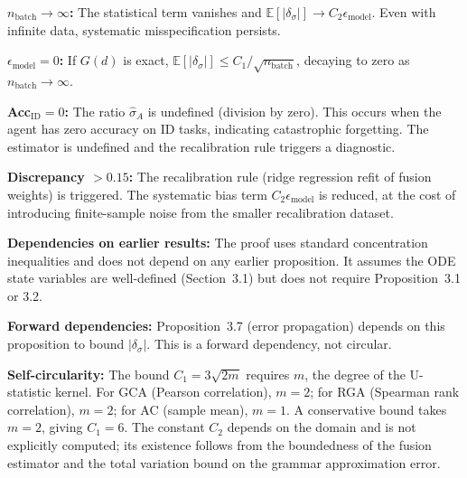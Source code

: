 \begin{boundary-case}
\textbf{$n_{\text{batch}} \to \infty$:}
The statistical term vanishes and $\mathbb{E}[|\delta_\sigma|] \to C_2 \epsilon_{\text{model}}$.
Even with infinite data, systematic misspecification persists.

\textbf{$\epsilon_{\text{model}} = 0$:}
If $G(d)$ is exact, $\mathbb{E}[|\delta_\sigma|] \leq C_1 / \sqrt{n_{\text{batch}}}$,
decaying to zero as $n_{\text{batch}} \to \infty$.

\textbf{Acc${}_{\text{ID}} = 0$:}
The ratio $\hat{\sigma}_A$ is undefined (division by zero). This occurs
when the agent has zero accuracy on ID tasks, indicating catastrophic
forgetting. The estimator is undefined and the recalibration rule
triggers a diagnostic.

\textbf{Discrepancy $> 0.15$:}
The recalibration rule (ridge regression refit of fusion weights) is
triggered. The systematic bias term $C_2 \epsilon_{\text{model}}$ is
reduced, at the cost of introducing finite-sample noise from the
smaller recalibration dataset.
\end{boundary-case}

\begin{circularity-check}
\textbf{Dependencies on earlier results:} The proof uses standard
concentration inequalities and does not depend on any earlier
proposition. It assumes the ODE state variables are well-defined
(Section~3.1) but does not require Proposition~3.1 or 3.2.

\textbf{Forward dependencies:} Proposition~3.7 (error propagation)
depends on this proposition to bound $|\delta_\sigma|$. This is a
forward dependency, not circular.

\textbf{Self-circularity:} The bound $C_1 = 3\sqrt{2m}$ requires
$m$, the degree of the U-statistic kernel. For GCA (Pearson
correlation), $m = 2$; for RGA (Spearman rank correlation),
$m = 2$; for AC (sample mean), $m = 1$. A conservative bound
takes $m = 2$, giving $C_1 = 6$. The constant $C_2$ depends on
the domain and is not explicitly computed; its existence follows
from the boundedness of the fusion estimator and the total variation
bound on the grammar approximation error.
\end{circularity-check}
